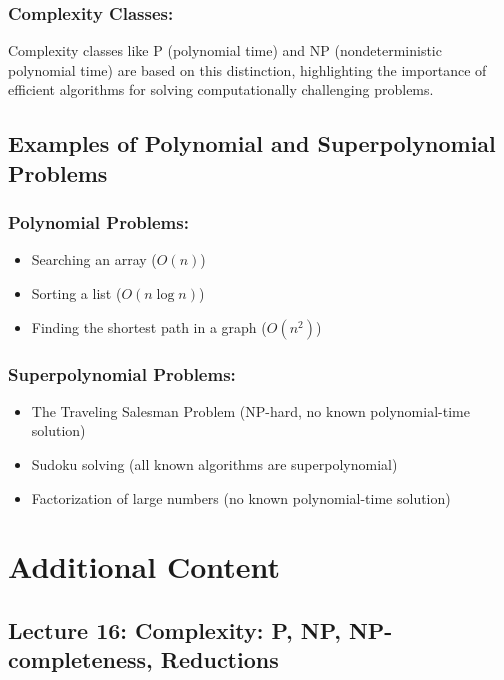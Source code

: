 \documentclass[12pt]{article}
\begin{document}
    \subsubsection{Complexity Classes:}
    Complexity classes like P (polynomial time) and NP (nondeterministic polynomial time) are based on this distinction, highlighting the importance of efficient algorithms for solving computationally challenging problems.

    \subsection{Examples of Polynomial and Superpolynomial Problems}

    \subsubsection{Polynomial Problems:}
    \begin{itemize}
        \item Searching an array ($O(n)$)
        \item Sorting a list ($O(n \log n)$)
        \item Finding the shortest path in a graph ($O(n^2)$)
    \end{itemize}

    \subsubsection{Superpolynomial Problems:}
    \begin{itemize}
        \item The Traveling Salesman Problem (NP-hard, no known polynomial-time solution)
        \item Sudoku solving (all known algorithms are superpolynomial)
        \item Factorization of large numbers (no known polynomial-time solution)
    \end{itemize}

    \section{Additional Content}

    \subsection{Lecture 16: Complexity: P, NP, NP-completeness, Reductions \cite{demaine2015complexity}}
\end{document}
